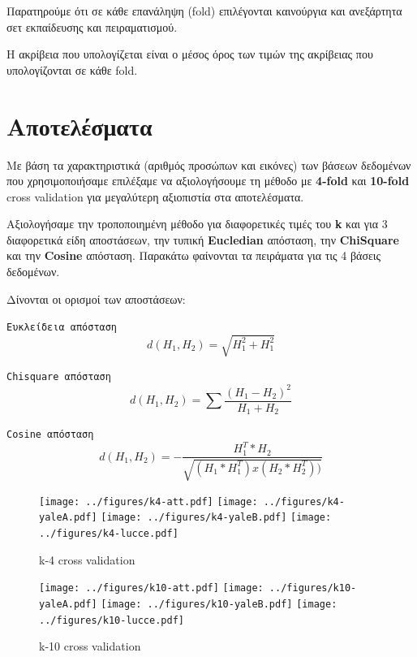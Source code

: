 Παρατηρούμε ότι σε κάθε επανάληψη (fold) επιλέγονται καινούργια και ανεξάρτητα
σετ εκπαίδευσης και πειραματισμού.

Η ακρίβεια που υπολογίζεται είναι ο μέσος όρος των τιμών της ακρίβειας που
υπολογίζονται σε κάθε fold.


\section{Αποτελέσματα}\label{sec:results}

Με βάση τα χαρακτηριστικά (αριθμός προσώπων και εικόνες) των βάσεων δεδομένων
που χρησιμοποιήσαμε επιλέξαμε να αξιολογήσουμε τη μέθοδο με \textbf{4-fold} και
\textbf{10-fold} cross validation για μεγαλύτερη αξιοπιστία στα αποτελέσματα.

Αξιολογήσαμε την τροποποιημένη μέθοδο για διαφορετικές τιμές του \textbf{k} και
για 3 διαφορετικά είδη αποστάσεων, την τυπική \textbf{Eucledian} απόσταση, την
\textbf{ChiSquare} και την \textbf{Cosine} απόσταση. Παρακάτω φαίνονται τα πειράματα
για τις 4 βάσεις δεδομένων.

Δίνονται οι ορισμοί των αποστάσεων:

\texttt{Ευκλείδεια απόσταση}
$$
d(H_1, H_2) = \sqrt{H_1^2 + H_1^2}
$$

\texttt{Chisquare απόσταση}
$$
d(H_1, H_2) = \sum{\frac{(H_1-H_2)^2}{H_1+H_2}}
$$

\texttt{Cosine απόσταση}
$$
d(H_1, H_2) = -\frac{H_1^T*H_2}{\sqrt{(H_1*H_1^T)x(H_2*H_2^T))}}
$$

\begin{figure}[htp]
    \centering
    \texttt{[image: ../figures/k4-att.pdf]}\hfill
    \texttt{[image: ../figures/k4-yaleA.pdf]}\hfill
    \texttt{[image: ../figures/k4-yaleB.pdf]}\hfill
    \texttt{[image: ../figures/k4-lucce.pdf]}\hfill

    \caption{k-4 cross validation}
    \label{fig:bee}

\end{figure}

\begin{figure}[htp]
    \centering
    \texttt{[image: ../figures/k10-att.pdf]}\hfill
    \texttt{[image: ../figures/k10-yaleA.pdf]}\hfill
    \texttt{[image: ../figures/k10-yaleB.pdf]}\hfill
    \texttt{[image: ../figures/k10-lucce.pdf]}\hfill

    \caption{k-10 cross validation}
    \label{fig:bee}

\end{figure}

